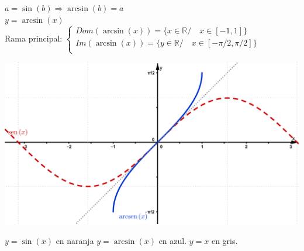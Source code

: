 \documentclass[a4paper,11pt,spanish,sans]{exam}
\begin{document}
\begin{minipage}{0.5\textwidth}
\centering
$a=\sin (b) \Rightarrow \arcsin(b)=a $ \\
$y=\arcsin(x)$\\ 
Rama principal:
$\begin{cases}
Dom(\arcsin(x))=\lbrace x \in \mathbb{R} / \quad x \in [-1,1] \rbrace \\
Im(\arcsin(x))=\lbrace y \in \mathbb{R} / \quad x \in [-\pi/2,\pi/2] \rbrace{}\\
\end{cases}
$
\end{minipage}
\begin{minipage}{0.5\textwidth}
\includegraphics[width=\linewidth]{arcsen.png}
\begin{center}
	$y=\sin (x) $ en naranja $y=\arcsin(x)$ en azul. $y=x$ en gris.
\end{center}
\end{minipage}
\end{document}
